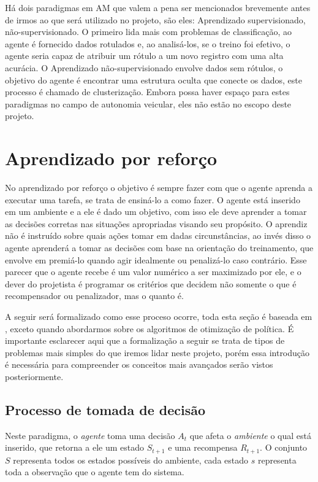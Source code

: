 Há dois paradigmas em AM que valem a pena ser mencionados brevemente antes de irmos ao que será utilizado no projeto, são eles: Aprendizado supervisionado, não-supervisionado. O primeiro lida mais com problemas de classificação, ao agente é fornecido dados rotulados e, ao analisá-los, se o treino foi efetivo, o agente seria capaz de atribuir um rótulo a um novo registro com uma alta acurácia. O Aprendizado não-supervisionado envolve dados sem rótulos, o objetivo do agente é encontrar uma estrutura oculta que conecte os dados, este processo é chamado de clusterização. Embora possa haver espaço para estes paradigmas no campo de autonomia veicular, eles não estão no escopo deste projeto.

\section{Aprendizado por reforço}
No aprendizado por reforço o objetivo é sempre fazer com que o agente aprenda a executar uma tarefa, se trata de ensiná-lo a como fazer. O agente está inserido em um ambiente e a ele é dado um objetivo, com isso ele deve aprender a tomar as decisões corretas nas situações apropriadas visando seu propósito. O aprendiz não é instruído sobre quais ações tomar em dadas circunstâncias, ao invés disso o agente aprenderá a tomar as decisões com base na orientação do treinamento, que envolve em premiá-lo quando agir idealmente ou penalizá-lo caso contrário. Esse parecer que o agente recebe é um valor numérico a ser maximizado por ele, e o dever do projetista é programar os critérios que decidem não somente o que é recompensador ou penalizador, mas o quanto é.

A seguir será formalizado como esse proceso ocorre, toda esta seção é baseada em , exceto quando abordarmos sobre os algoritmos de otimização de política. É importante esclarecer aqui que a formalização a seguir se trata de tipos de problemas mais simples do que iremos lidar neste projeto, porém essa introdução é necessária para compreender os conceitos mais avançados serão vistos posteriormente.

\subsection{Processo de tomada de decisão} \label{mdp-section}
Neste paradigma, o \textit{agente} toma uma decisão $A_t$ que afeta o \textit{ambiente} o qual está inserido, que retorna a ele um estado $S_{t+1}$ e uma recompensa $R_{t+1}$. O conjunto $S$ representa todos os estados possíveis do ambiente, cada estado $s$ representa toda a observação que o agente tem do sistema. 

